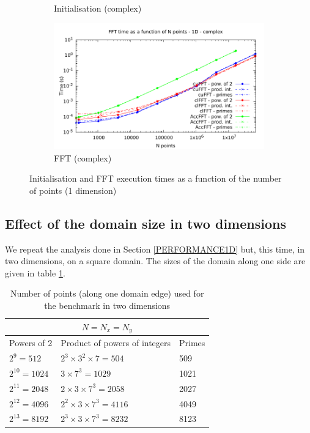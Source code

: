\documentclass[12pt, a4paper]{article}
\begin{document}
\begin{figure}[htb]
\begin{subfigure}{.5\textwidth}
\caption{Initialisation (complex)}
\label{FFT1DCI}
\end{subfigure}%
\begin{subfigure}{.5\textwidth}
\centering
\includegraphics[width=.9\linewidth]{graphs/fft-1d-c-exec.pdf}
\caption{FFT (complex)}
\label{FFT1DCE}
\end{subfigure}
\caption{Initialisation and FFT execution times as a function of the number of points (1 dimension)}
\label{FFT1D}
\end{figure}

\subsection{Effect of the domain size in two dimensions}\label{PERFORMANCE2D}
We repeat the analysis done in Section \ref{PERFORMANCE1D} but, this
time, in two dimensions, on a square domain. The sizes of the domain along one side
are given in table \ref{2DSIZES}.

\begin{table}[H]
\centering
\begin{tabular}{|l|l|l|}
  \hline
  \multicolumn{3}{|c|}{$N=N_x=N_y$}\\
  \hline
  \hline
Powers of 2 & Product of powers of integers & Primes\\ \hline
$2^9 = 512$ & $2^3\times 3^2\times 7 = 504$ & 509\\ \hline
$2^{10} = 1024$ & $3\times 7^3 = 1029$ & 1021\\ \hline
$2^{11} = 2048$	& $2\times 3 \times 7^3 = 2058$ &	2027\\ \hline
$2^{12} = 4096$	& $2^2\times 3\times 7^3 = 4116$ & 4049\\ \hline
$2^{13} = 8192$	& $2^3\times 3\times 7^3 = 8232$ & 8123\\ \hline
\end{tabular}
\caption{Number of points (along one domain edge) used for the benchmark in two dimensions}\label{2DSIZES}
\end{table}
\end{document}
